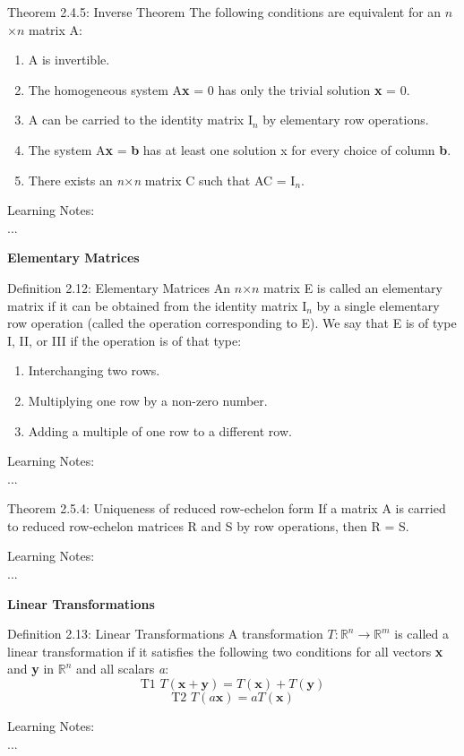 \documentclass[
  12pt,
  a4paper,
]{article}
\begin{document}
\begin{box_purple}{Theorem 2.4.5: Inverse Theorem}
The following conditions are equivalent for an $n$×$n$ matrix A:
\begin{enumerate}
    \item A is invertible.
    \item The homogeneous system A\textbf{x} = 0 has only the trivial solution \textbf{x} = 0.
    \item A can be carried to the identity matrix I$_n$ by elementary row operations.
    \item The system A\textbf{x} = \textbf{b} has at least one solution x for every choice of column \textbf{b}.
    \item There exists an \textit{n}×\textit{n} matrix C such that AC = I$_n$.
\end{enumerate}
\end{box_purple}
\noindent
Learning Notes:
\\...

\noindent
\textbf{Elementary Matrices}

\begin{box_purple}{Definition 2.12: Elementary Matrices}
An $n$×$n$ matrix E is called an elementary matrix if it can be obtained from the identity matrix I$_n$ by a single elementary row operation (called the operation corresponding to E). We say that E is of type I, II, or III if the operation is of that type: 
\begin{enumerate}
    \item[I.] Interchanging two rows.
    \item[II.] Multiplying one row by a non-zero number.
    \item[III.]	Adding a multiple of one row to a different row.
\end{enumerate}
\end{box_purple}
\noindent
Learning Notes:
\\...

\begin{box_purple}{Theorem 2.5.4: Uniqueness of reduced row-echelon form}
If a matrix A is carried to reduced row-echelon matrices R and S by row operations, then R = S.
\end{box_purple}
\noindent
Learning Notes:
\\...

\noindent
\textbf{Linear Transformations}

\begin{box_purple}{Definition 2.13: Linear Transformations}
A transformation $T : \mathbb{R}^n \xrightarrow{} \mathbb{R}^m$ is called a linear transformation if it satisfies the following two conditions for all vectors \textbf{x} and \textbf{y} in $\mathbb{R}^n$ and all scalars \textit{a}:
$$\text{T1 } T(\textbf{x}+\textbf{y}) = T(\textbf{x})+T(\textbf{y})$$
$$\text{T2 } T(a\textbf{x}) = aT(\textbf{x})$$
\end{box_purple}
\noindent
Learning Notes:
\\...
\end{document}
